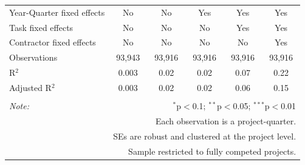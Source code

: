 \documentclass[
]{article}
\begin{document}
\begin{table}[H]
\begin{tabular}{@{\extracolsep{-2pt}}lccccc}
Year-Quarter fixed effects & No & No & Yes & Yes & Yes \\ 
Task fixed effects & No & No & No & Yes & Yes \\ 
Contractor fixed effects & No & No & No & No & Yes \\ 
Observations & 93,943 & 93,916 & 93,916 & 93,916 & 93,916 \\ 
R$^{2}$ & 0.003 & 0.02 & 0.02 & 0.07 & 0.22 \\ 
Adjusted R$^{2}$ & 0.003 & 0.02 & 0.02 & 0.06 & 0.15 \\ 
\hline 
\hline \\[-1.8ex] 
\textit{Note:}  & \multicolumn{5}{r}{$^{*}$p$<$0.1; $^{**}$p$<$0.05; $^{***}$p$<$0.01} \\ 
 & \multicolumn{5}{r}{Each observation is a project-quarter.} \\ 
 & \multicolumn{5}{r}{SEs are robust and clustered at the project level.} \\ 
 & \multicolumn{5}{r}{Sample restricted to fully competed projects.} \\ 
\end{tabular} 
\end{table}
\end{document}
